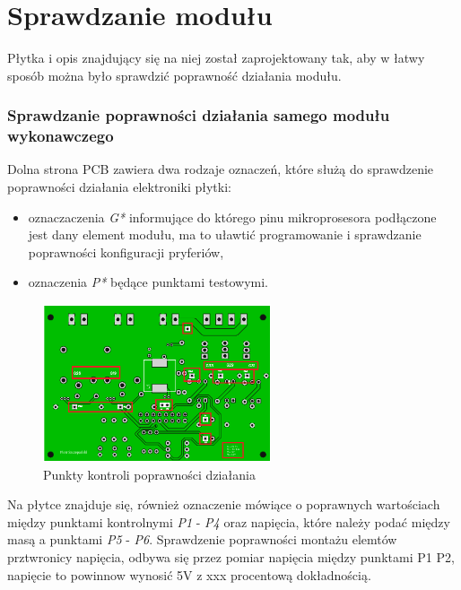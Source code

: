 \documentclass[12pt, eng, twoside, openany, final]{mgr}
\begin{document}
    \newpage
    \section{Sprawdzanie modułu}
            Płytka i opis znajdujący się na niej został zaprojektowany tak, aby w łatwy sposób można było sprawdzić poprawność działania modułu. 
            
            \subsubsection{Sprawdzanie poprawności działania samego modułu wykonawczego}
            Dolna strona PCB zawiera dwa rodzaje oznaczeń, które służą do sprawdzenie poprawności działania elektroniki płytki:
            \begin{itemize}
                \item oznaczaczenia \emph{G*} informujące do którego pinu mikroprosesora podłączone jest dany element modułu, ma to uławtić programowanie i sprawdzanie poprawności konfiguracji pryferiów,
                \item oznaczenia \emph{P*} będące punktami testowymi.
            \end{itemize}
               \begin{figure}[H]
                \begin{center}
                    \includegraphics[width=0.6\textwidth]{pcb_dol_zaz.png}
                    \caption{Punkty kontroli poprawności działania}
                \end{center}
                \end{figure}
            Na płytce znajduje się, również oznaczenie mówiące o poprawnych wartościach między punktami kontrolnymi \emph{P1} - \emph{P4} oraz napięcia, które należy podać między masą a punktami \emph{P5} - \emph{P6}.
            Sprawdzenie poprawności montażu elemtów prztwronicy napięcia, odbywa się przez pomiar napięcia między punktami P1 P2, napięcie to powinnow wynosić 5V z xxx procentową dokładnością.
\end{document}
